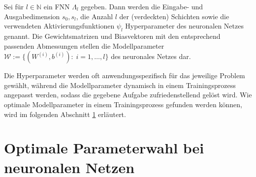 \begin{defi}
    Sei für $l \in \mathbb{N}$ ein FNN $\Lambda_l$ gegeben. Dann werden die Eingabe- und Ausgabedimension $s_0, s_l$, die Anzahl $l$ der (verdeckten) Schichten sowie die verwendeten Aktivierungsfunktionen $\psi_l$ Hyperparameter des neuronalen Netzes genannt.
    Die Gewichtsmatrizen und Biasvektoren mit den entsprechend passenden Abmessungen stellen die Modellparameter $\mathcal{W}:=\{(W^{(i)},b^{(i)}): \; i=1, \ldots, l\}$ des neuronales Netzes dar. 
\end{defi}
Die Hyperparameter werden oft anwendungsspezifisch für das jeweilige Problem gewählt, während die Modellparameter dynamisch in einem Trainingsprozess angepasst werden, sodass die gegebene Aufgabe zufriedenstellend gelöst wird. Wie optimale Modellparameter in einem Trainingsprozess gefunden werden können, wird im folgenden Abschnitt \ref{abs:task_training} erläutert.

\section{Optimale Parameterwahl bei neuronalen Netzen}
\label{abs:task_training}

